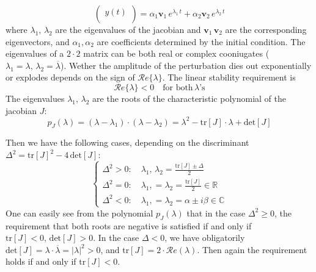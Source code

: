 {\begin{equation*}
\begin{pmatrix}
        y(t) \\
    \end{pmatrix}
     = 
     \alpha_1 \mathbf{v}_1\, e^{\lambda_1\, t} + \alpha_2 \mathbf{v}_2\, e^{\lambda_2\, t} 
\end{equation*}
where $\lambda_1,\, \lambda_2$ are the eigenvalues of the jacobian and $\mathbf{v}_1\, \mathbf{v}_2$ are the corresponding eigenvectors, and $\alpha_1, \alpha_2$ are coefficients determined by the initial condition. The eigenvalues of a $2\cdot 2$ matrix can be both real or complex cooniugates ($\lambda_1 = \lambda, \, \lambda_2 = \overline{\lambda}$). Wether the amplitude of the perturbation dies out exponentially or explodes depends on the sign of $\mathcal{R}e\{\lambda\}$. The linear stability requirement is
$$
\mathcal{R}e\{\lambda\} <0 \quad \text{for both} \, \lambda\text{'s}
$$
The eigenvalues $\lambda_1,\, \lambda_2$ are the roots of the characteristic polynomial of the jacobian $J$:
\begin{equation*}
    p_J(\lambda) = (\lambda - \lambda_1)\cdot (\lambda - \lambda_2) = \lambda^2 - \text{tr}[J]\cdot\lambda + \text{det}[J]
\end{equation*}
\begin{minipage}{0.4\textwidth}
Then we have the following cases, depending on the discriminant $\Delta^2 = \text{tr}[J]^2 - 4\,\text{det}[J]$:
\begin{equation*}
    \begin{cases}
        \Delta^2 > 0: \quad \lambda_1,\, \lambda_2  =  \frac{\text{tr}[J] \pm \Delta }{2} \\
        \Delta^2 = 0: \quad \lambda_1,= \lambda_2 = \frac{\text{tr}[J]}{2} \in \mathbb{R} \\
        \Delta^2 <0: \quad \lambda_1,= \lambda_2  = \alpha \pm i \beta \in \mathbb{C}
    \end{cases}
\end{equation*}
One can easily see from the polynomial $p_J(\lambda)$ that in the case $\Delta^2 \geq 0$, the requirement that both roots are negative is satisfied if and only if $\text{tr}[J]<0,\, \text{det}[J] >0$. In the case $\Delta <0$, we have obligatorily $\text{det}[J] = \lambda \cdot \overline{\lambda} = |\lambda|^2 >0$, and $\text{tr}[J]= 2\cdot \mathcal{R}e(\lambda)$. Then again the requirement holds if and only if $\text{tr}[J]< 0$.
\end{minipage}
\hfill
{}
\begin{minipage}{0.5\textwidth}
\centering

\end{minipage}}
